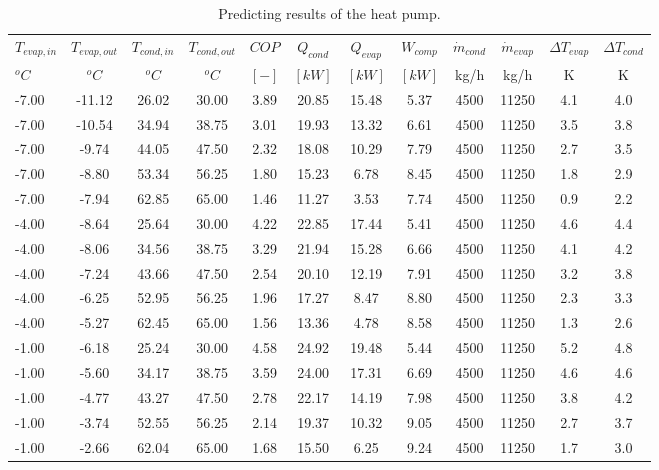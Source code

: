 \documentclass[english]{SPFShortReport}
\begin{document}
\begin{table}[!ht]
\begin{small}
\caption{Predicting results of the heat pump.}
\begin{center}
\resizebox{12cm}{!} 
{
\begin{tabular}{l | c c c c c c c c c c c } 
\hline
\hline
$T_{evap,in}$ &$T_{evap,out}$ &$T_{cond,in}$ &$T_{cond,out}$ &$COP$ &$Q_{cond}$ &$Q_{evap}$ &$W_{comp}$ &$\dot m_{cond}$ &$\dot m_{evap}$ &$\Delta T_{evap}$ &$\Delta T_{cond}$ \\ 
$^oC$ &$^oC$ &$^oC$ &$^oC$ &$[-]$ &$[kW]$ &$[kW]$ &$[kW]$ &kg/h &kg/h &K &K\\ 
\hline
-7.00 & -11.12 & 26.02 & 30.00 & 3.89 & 20.85 & 15.48 & 5.37 & 4500 & 11250 & 4.1 & 4.0\\ 
-7.00 & -10.54 & 34.94 & 38.75 & 3.01 & 19.93 & 13.32 & 6.61 & 4500 & 11250 & 3.5 & 3.8\\ 
-7.00 & -9.74 & 44.05 & 47.50 & 2.32 & 18.08 & 10.29 & 7.79 & 4500 & 11250 & 2.7 & 3.5\\ 
-7.00 & -8.80 & 53.34 & 56.25 & 1.80 & 15.23 & 6.78 & 8.45 & 4500 & 11250 & 1.8 & 2.9\\ 
-7.00 & -7.94 & 62.85 & 65.00 & 1.46 & 11.27 & 3.53 & 7.74 & 4500 & 11250 & 0.9 & 2.2\\ 
-4.00 & -8.64 & 25.64 & 30.00 & 4.22 & 22.85 & 17.44 & 5.41 & 4500 & 11250 & 4.6 & 4.4\\ 
-4.00 & -8.06 & 34.56 & 38.75 & 3.29 & 21.94 & 15.28 & 6.66 & 4500 & 11250 & 4.1 & 4.2\\ 
-4.00 & -7.24 & 43.66 & 47.50 & 2.54 & 20.10 & 12.19 & 7.91 & 4500 & 11250 & 3.2 & 3.8\\ 
-4.00 & -6.25 & 52.95 & 56.25 & 1.96 & 17.27 & 8.47 & 8.80 & 4500 & 11250 & 2.3 & 3.3\\ 
-4.00 & -5.27 & 62.45 & 65.00 & 1.56 & 13.36 & 4.78 & 8.58 & 4500 & 11250 & 1.3 & 2.6\\ 
-1.00 & -6.18 & 25.24 & 30.00 & 4.58 & 24.92 & 19.48 & 5.44 & 4500 & 11250 & 5.2 & 4.8\\ 
-1.00 & -5.60 & 34.17 & 38.75 & 3.59 & 24.00 & 17.31 & 6.69 & 4500 & 11250 & 4.6 & 4.6\\ 
-1.00 & -4.77 & 43.27 & 47.50 & 2.78 & 22.17 & 14.19 & 7.98 & 4500 & 11250 & 3.8 & 4.2\\ 
-1.00 & -3.74 & 52.55 & 56.25 & 2.14 & 19.37 & 10.32 & 9.05 & 4500 & 11250 & 2.7 & 3.7\\ 
-1.00 & -2.66 & 62.04 & 65.00 & 1.68 & 15.50 & 6.25 & 9.24 & 4500 & 11250 & 1.7 & 3.0\\ 

\end{tabular}}
\end{center}
\end{small}
\end{table}
\end{document}
